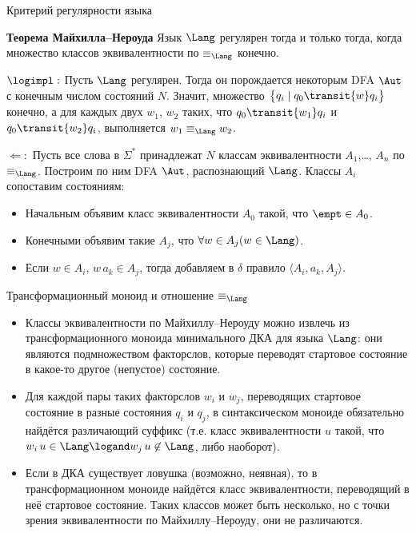 \begin{frame}{Критерий регулярности языка}

\begin{block}{\bf Теорема Майхилла--Нероуда}
Язык $\Lang$ регулярен тогда и только тогда, когда множество классов эквивалентности по $\equiv_{\Lang}$ конечно.
\end{block}
{$\logimpl:$ Пусть $\Lang$ регулярен. Тогда он порождается некоторым DFA $\Aut$ с конечным числом состояний $N$. Значит, множество $\bigl\lbrace{}q_i\mid q_0\transit{w} q_i\bigr\rbrace{}$ конечно, а для каждых двух $w_1$, $w_2$ таких, что $q_0\transit{w_1} q_i$ и $q_0\transit{w_2} q_i$, выполняется $w_1\equiv_{\Lang} w_2$.}

\medskip
{$\Leftarrow:$ Пусть все слова в $\Sigma^*$ принадлежат $N$ классам эквивалентности $A_1$,\dots, $A_n$ по $\equiv_{\Lang}$. Построим по ним DFA $\Aut$, распознающий $\Lang$. Классы $A_i$ сопоставим состояниям:
\begin{itemize}
\item Начальным объявим класс эквивалентности $A_0$ такой, что $\empt\in A_0$.
\item Конечными объявим такие $A_j$, что $\forall w\in A_j (w\in\Lang)$.
\item Если $w\in A_i$, $w\,a_k\in A_j$, тогда добавляем в $\delta$ правило $\langle A_i, a_k, A_j\rangle$.
\end{itemize}}
\end{frame}

\begin{frame}{Трансформационный моноид и отношение $\equiv_{\Lang}$}
\begin{itemize}
\item Классы эквивалентности по Майхиллу--Нероуду можно извлечь из трансформационного моноида минимального ДКА для языка $\Lang$: они являются подмножеством факторслов, которые переводят стартовое состояние в какое-то другое (непустое) состояние.
\item Для каждой пары таких факторслов $w_i$ и $w_j$, переводящих стартовое состояние в разные состояния $q_i$ и $q_j$, в синтаксическом моноиде обязательно найдётся различающий суффикс (т.е. класс эквивалентности $u$ такой, что $w_i\,u\in\Lang\logand w_j\,u\not\in\Lang$, либо наоборот).
\item Если в ДКА существует ловушка (возможно, неявная), то в трансформационном моноиде найдётся класс эквивалентности, переводящий в неё стартовое состояние. Таких классов может быть несколько, но с точки зрения эквивалентности по Майхиллу--Нероуду, они не различаются.  
\end{itemize}

\end{frame}

